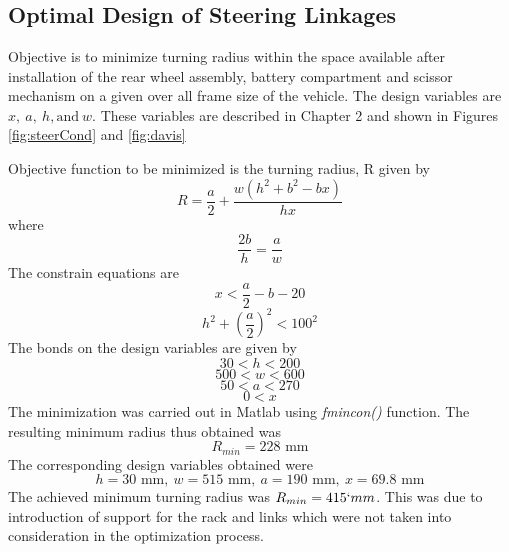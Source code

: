 \chapter{ }
\section{Optimal Design of Steering Linkages}
\label{Ch:ApenC}

Objective is to  minimize turning radius within the space available after installation  of the rear wheel assembly, battery compartment and scissor mechanism  on a given over all frame size of the vehicle. The design variables are $x,~ a, ~h,\text{and} ~w$. These variables are described in Chapter 2 and shown in Figures \ref{fig:steerCond} and \ref{fig:davis}


Objective function to be minimized is the turning radius, R  given by
\begin{equation}
R=\dfrac{a}{2}+\dfrac{w(h^2+b^2-bx)}{hx}
\end{equation}
where
\[\dfrac{2b}{h}= \dfrac{a}{w}\]
The constrain equations are 
\[
x<\frac{a}{2}-b-20
\]
\[ h^2+\left(\dfrac{a}{2}\right)^2<100^2
\]
The bonds on the design variables are given by
\[30<h<200\]
\[500<w<600\]
\[50<a<270\]
\[0<x\]
The minimization was carried out in Matlab using \textit{fmincon()} function.
 The resulting minimum radius thus obtained was 
 \[R_{min}=228 \text{ mm}\]
 The corresponding design variables obtained were 
 \[h=30 \text{ mm},~ w=515 \text{ mm}, ~ a=190 \text{ mm}, ~x=69.8 \text{ mm}\] 
 The achieved minimum turning radius was $R_{min}=415`mm$. This was due to introduction of support for the rack and links which were not taken into consideration in the optimization process.
 